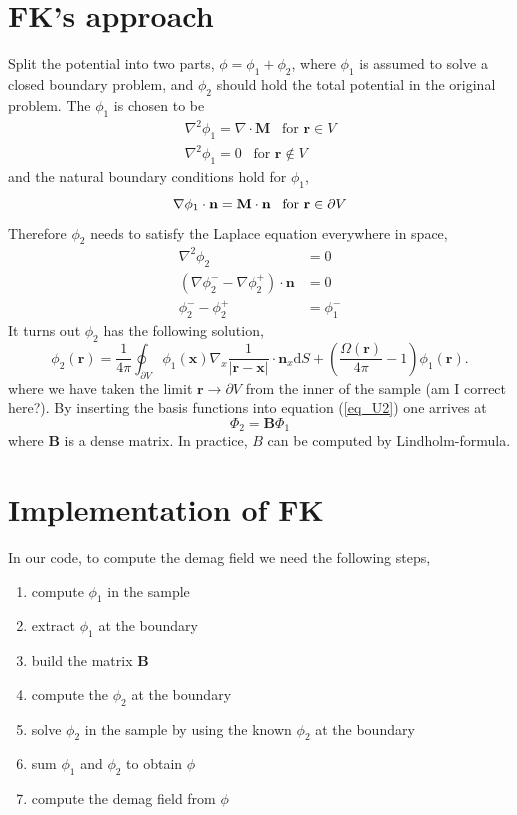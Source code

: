 \documentclass[paper=a4]{scrartcl}
\newcommand{\mvec}[1]{\ensuremath{\mathbf{#1}}}
\begin{document}
\section{FK's approach}
Split the potential into two parts, $\phi = \phi_1+\phi_2$, where $\phi_1$ is assumed to solve a closed boundary problem,
and $\phi_2$ should hold the total potential in the original problem.
The $\phi_1$ is chosen to be 
\begin{align}
\nabla^2 \phi_1 =  \nabla \cdot \mvec{M} \;\;\; \text{for } \mvec{r} \in V\\
\nabla^2 \phi_1 = 0 \;\;\; \text{for } \mvec{r} \not\in V
\end{align}
and the natural boundary conditions hold for $\phi_1$, 
\begin{equation}\label{eq_h}
\nabla \phi_1 \cdot \mvec{n} = \mvec{M} \cdot \mvec{n} \;\;\; \text{for } \mvec{r} \in \partial V\\
\end{equation}
Therefore $\phi_2$ needs to satisfy the Laplace equation everywhere in space, 
\begin{align}
\nabla^2 \phi_2 &=  0\\
(\nabla \phi_2^{-} - \nabla \phi_2^{+}) \cdot \mvec{n} &= 0\\
\phi_2^{-} - \phi_2^{+} &= \phi_1^{-} 
\end{align}
It turns out $\phi_2$ has the following solution, 
\begin{equation}\label{eq_U2}
\phi_2(\mvec{r})=\frac{1}{4\pi}\oint_{\partial V} \phi_1 (\mvec{x}) \nabla_x \frac{1}{|\mvec{r}-\mvec{x}|}\cdot \mvec{n}_x \mathrm{d}S
+\left( \frac{\Omega(\mvec{r})}{4\pi}-1 \right) \phi_1(\mvec{r}).
\end{equation}
where we have taken the limit $\mvec{r} \rightarrow \partial V$ from the inner of the sample (am I correct here?). 
By inserting the basis functions into equation (\ref{eq_U2}) one arrives at 
\begin{equation}
\Phi_2 = \mvec{B} \Phi_1
\end{equation}
where $\mvec{B}$ is a dense matrix. In practice, $B$ can be computed by Lindholm-formula.

\section{Implementation of FK}
In our code, to compute the demag field we need the following steps,
\begin{enumerate}
  \item compute $\phi_1$ in the sample
  \item extract $\phi_1$ at the boundary
  \item build the matrix $\mvec{B}$
  \item compute the $\phi_2$ at the boundary
  \item solve $\phi_2$ in the sample by using the known $\phi_2$ at the boundary
  \item sum $\phi_1$ and $\phi_2$ to obtain $\phi$ 
  \item compute the demag field from $\phi$
\end{enumerate}
\end{document}
